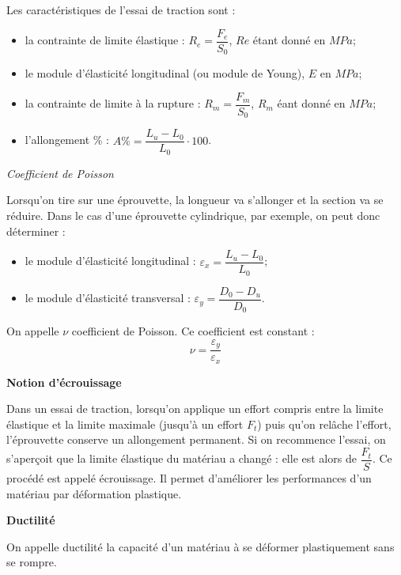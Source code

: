 \documentclass[11pt,oneside]{article}
\begin{document}
\begin{resultat}
Les caractéristiques de l'essai de traction sont :
\begin{itemize}
\item la contrainte de limite élastique : $R_e = \dfrac{F_e}{S_0}$, $Re$ étant donné en $MPa$;
\item le module d'élasticité longitudinal (ou module de Young), $E$ en $MPa$; 
\item la contrainte de limite à la rupture : $R_m = \dfrac{F_m}{S_0}$, $R_m$ éant donné en $MPa$;
\item l'allongement \% : $A\% = \dfrac{L_u-L_0}{L_0} \cdot 100$.
\end{itemize}
\end{resultat}

\begin{rem}
\textit{Coefficient de Poisson}

Lorsqu'on tire sur une éprouvette, la longueur va s'allonger et la section va se réduire. Dans le cas d'une éprouvette cylindrique, par exemple, on peut donc déterminer :
\begin{itemize}
\item le module d'élasticité longitudinal : $\varepsilon_x = \dfrac{L_u-L_0}{L_0}$;
\item le module d'élasticité transversal : $\varepsilon_y = \dfrac{D_0-D_u}{D_0}$.
\end{itemize}

On appelle $\nu$ coefficient de Poisson. Ce coefficient est constant :
$$
\nu = \dfrac{\varepsilon_y}{\varepsilon_x}
$$

\end{rem}


\begin{rem}
 \textbf{Notion d'écrouissage}

Dans un essai de traction, lorsqu'on applique un effort compris entre la limite élastique et la limite maximale (jusqu'à un effort $F_t$) puis qu'on relâche l'effort, l'éprouvette conserve un allongement permanent. Si on recommence l'essai, on s'aperçoit que la limite élastique du matériau a changé : elle est alors de $\dfrac{F_t}{S}$. Ce procédé est appelé écrouissage. Il permet d'améliorer les performances d'un matériau par déformation plastique. 

\end{rem}

\begin{rem}
 \textbf{Ductilité}

On appelle ductilité la capacité d'un matériau à se déformer plastiquement sans se rompre.

\end{rem}
\end{document}
